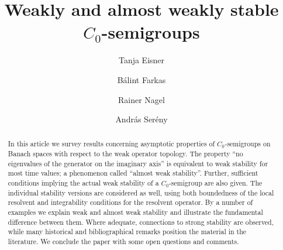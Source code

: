 \documentclass[11pt,intlimits, draft,oneside]{amsart}
\theoremstyle{definition}
\begin{document}
\title{Weakly and almost weakly stable $C_0$-semigroups}


\author{Tanja Eisner}

\author{B\'{a}lint Farkas}

\address{B\'{a}lint Farkas \newline
AG Angewandte Analysis, Fachbereich Mathematik, Technische
Universit\"{a}t Darmstadt\newline Schlo{\ss}gartenstra{\ss}e 7,
D-64289 Darmstadt, Germany}

\author{Rainer Nagel}

\address{Tanja Eisner, Rainer Nagel \newline
Mathematisches Institut, Universit\"{a}t T\"{u}bingen\newline Auf
der Morgenstelle 10, D-70176, T\"{u}bingen, Germany}

\author{Andr\'{a}s Ser\'{e}ny}

\let\oldthefootnote\thefootnote\def\thefootnote{}
\let\thefootnote\oldthefootnote
\address{Andr\'{a}s Ser\'{e}ny \newline
Department of Mathematics and its Applications, Central European
University,\newline N\'{a}dor utca  9, H-1051 Budapest, Hungary }


\begin{abstract}
In this article we survey results concerning asymptotic properties
of $C_0$-semigroups on Banach spaces with respect to the weak
operator topology. The property ``no eigenvalues of
the generator on the imaginary axis'' is equivalent to weak
stability for 
most time values; a phenomenon called
``almost weak stability''. Further, sufficient conditions implying
the actual weak stability of a $C_0$-semigroup are also given. The
individual stability versions are considered as well, using both
boundedness of the local resolvent and integrability conditions for
the resolvent operator. By a number of examples we explain
weak and almost weak stability and illustrate the fundamental
difference between them. Where adequate, connections to strong
stability are observed, while many historical and
bibliographical remarks 
position the material in the
literature. We conclude the paper with some open questions and
comments.
\end{abstract}
\end{document}
